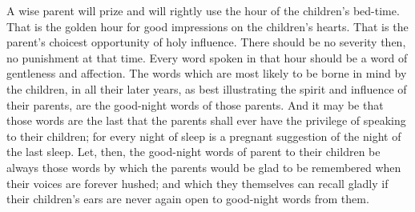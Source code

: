 \documentclass[
]{book}
\begin{document}
A wise parent will prize and will rightly use the hour of the children's bed-time. That is the golden hour for good impressions on the children's hearts. That is the parent's choicest opportunity of holy influence. There should be no severity then, no punishment at that time. Every word spoken in that hour should be a word of gentleness and affection. The words which are most likely to be borne in mind by the children, in all their later years, as best illustrating the spirit and influence of their parents, are the good-night words of those parents. And it may be that those words are the last that the parents shall ever have the privilege of speaking to their children; for every night of sleep is a pregnant suggestion of the night of the last sleep. Let, then, the good-night words of parent to their children be always those words by which the parents would be glad to be remembered when their voices are forever hushed; and which they themselves can recall gladly if their children's ears are never again open to good-night words from them.
\end{document}
